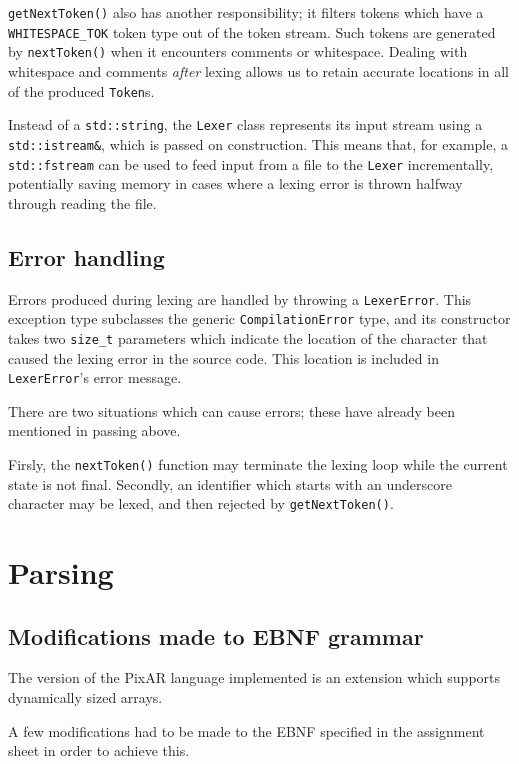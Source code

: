 \documentclass[11pt,a4paper]{scrartcl}
\begin{document}
\verb|getNextToken()| also has another responsibility; it filters tokens which have a \verb|WHITESPACE_TOK| token type out of the token stream. Such tokens are generated by \verb|nextToken()| when it encounters comments or whitespace. Dealing with whitespace and comments \textit{after} lexing allows us to retain accurate locations in all of the produced \verb|Token|s.

Instead of a \verb|std::string|, the \verb|Lexer| class represents its input stream using a \verb|std::istream&|, which is passed on construction. This means that, for example, a \verb|std::fstream| can be used to feed input from a file to the \verb|Lexer| incrementally, potentially saving memory in cases where a lexing error is thrown halfway through reading the file.

\subsection{Error handling}

Errors produced during lexing are handled by throwing a \verb|LexerError|. This exception type subclasses the generic \verb|CompilationError| type, and its constructor takes two \verb|size_t| parameters which indicate the location of the character that caused the lexing error in the source code. This location is included in \verb|LexerError|'s error message.

There are two situations which can cause errors; these have already been mentioned in passing above.

Firsly, the \verb|nextToken()| function may terminate the lexing loop while the current state is not final. Secondly, an identifier which starts with an underscore character may be lexed, and then rejected by \verb|getNextToken()|.

\newpage

\section{Parsing}

\subsection{Modifications made to EBNF grammar}

The version of the PixAR language implemented is an extension which supports dynamically sized arrays.

A few modifications had to be made to the EBNF specified in the assignment sheet in order to achieve this.
\end{document}
